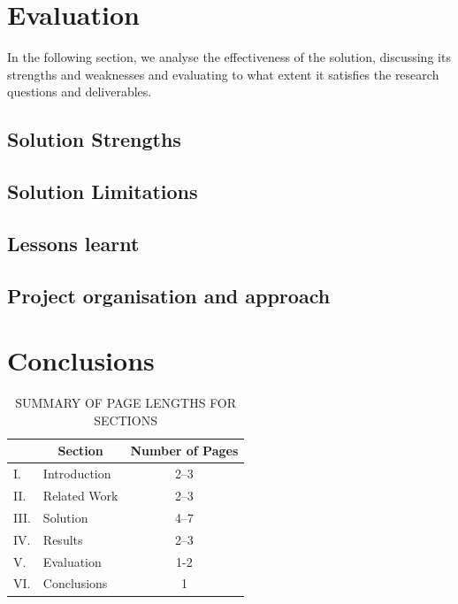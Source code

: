 \documentclass[12pt,a4paper]{article}
\begin{document}
\newpage

\section{Evaluation}
In the following section, we analyse the effectiveness of the solution, discussing its strengths and weaknesses and evaluating to what extent it satisfies the research questions and deliverables.

\subsection{Solution Strengths}

\subsection{Solution Limitations}

\subsection{Lessons learnt}

\subsection{Project organisation and approach}




\section{Conclusions}



\begin{table}[htb]
\centering
\caption{SUMMARY OF PAGE LENGTHS FOR SECTIONS}
\vspace*{6pt}
\label{summary}
\begin{tabular}{|ll|c|} \hline
& \multicolumn{1}{c|}{\bf Section} & {\bf Number of Pages} \\ \hline
I. & Introduction & 2--3 \\ \hline
II. & Related Work & 2--3 \\ \hline
III. & Solution & 4--7 \\ \hline
IV. & Results & 2--3 \\ \hline
V. & Evaluation & 1-2 \\ \hline
VI. & Conclusions & 1 \\ \hline
\end{tabular}
\end{table}



\end{document}
